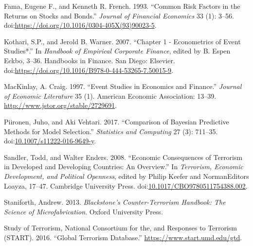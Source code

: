 \documentclass[]{AEA}
\begin{document}
\hypertarget{ref-FAMA19933}{}
Fama, Eugene F., and Kenneth R. French. 1993. ``Common Risk Factors in
the Returns on Stocks and Bonds.'' \emph{Journal of Financial Economics}
33 (1): 3--56.
doi:\href{https://doi.org/https://doi.org/10.1016/0304-405X(93)90023-5}{https://doi.org/10.1016/0304-405X(93)90023-5}.

\hypertarget{ref-Kothari20073}{}
Kothari, S.P., and Jerold B. Warner. 2007. ``Chapter 1 - Econometrics of
Event Studies*.'' In \emph{Handbook of Empirical Corporate Finance},
edited by B. Espen Eckbo, 3--36. Handbooks in Finance. San Diego:
Elsevier.
doi:\href{https://doi.org/https://doi.org/10.1016/B978-0-444-53265-7.50015-9}{https://doi.org/10.1016/B978-0-444-53265-7.50015-9}.

\hypertarget{ref-10.2307ux2f2729691}{}
MacKinlay, A. Craig. 1997. ``Event Studies in Economics and Finance.''
\emph{Journal of Economic Literature} 35 (1). American Economic
Association: 13--39. \url{http://www.jstor.org/stable/2729691}.

\hypertarget{ref-Piironen2017}{}
Piironen, Juho, and Aki Vehtari. 2017. ``Comparison of Bayesian
Predictive Methods for Model Selection.'' \emph{Statistics and
Computing} 27 (3): 711--35.
doi:\href{https://doi.org/10.1007/s11222-016-9649-y}{10.1007/s11222-016-9649-y}.

\hypertarget{ref-sandler_enders_2008}{}
Sandler, Todd, and Walter Enders. 2008. ``Economic Consequences of
Terrorism in Developed and Developing Countries: An Overview.'' In
\emph{Terrorism, Economic Development, and Political Openness}, edited
by Philip Keefer and NormanEditors Loayza, 17--47. Cambridge University
Press.
doi:\href{https://doi.org/10.1017/CBO9780511754388.002}{10.1017/CBO9780511754388.002}.

\hypertarget{ref-Blackstone}{}
Staniforth, Andrew. 2013. \emph{Blackstone's Counter-Terrorism Handbook:
The Science of Microfabrication}. Oxford University Press.

\hypertarget{ref-GTD}{}
Study of Terrorism, National Consortium for the, and Responses to
Terrorism (START). 2016. ``Global Terrorism Database.''
\url{https://www.start.umd.edu/gtd}.
\end{document}

